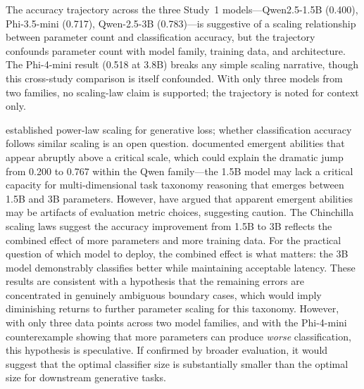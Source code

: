 \documentclass{article}
\begin{document}
The accuracy trajectory across the three Study~1 models---Qwen2.5-1.5B (0.400), Phi-3.5-mini (0.717), Qwen-2.5-3B (0.783)---is suggestive of a scaling relationship between parameter count and classification accuracy, but the trajectory confounds parameter count with model family, training data, and architecture. The Phi-4-mini result (0.518 at 3.8B) breaks any simple scaling narrative, though this cross-study comparison is itself confounded. With only three models from two families, no scaling-law claim is supported; the trajectory is noted for context only.

\citet{kaplan2020scaling} established power-law scaling for generative loss; whether classification accuracy follows similar scaling is an open question. \citet{wei2022emergent} documented emergent abilities that appear abruptly above a critical scale, which could explain the dramatic jump from 0.200 to 0.767 within the Qwen family---the 1.5B model may lack a critical capacity for multi-dimensional task taxonomy reasoning that emerges between 1.5B and 3B parameters. However, \citet{schaeffer2024mirage} have argued that apparent emergent abilities may be artifacts of evaluation metric choices, suggesting caution. The Chinchilla scaling laws \citep{hoffmann2022chinchilla} suggest the accuracy improvement from 1.5B to 3B reflects the combined effect of more parameters and more training data. For the practical question of which model to deploy, the combined effect is what matters: the 3B model demonstrably classifies better while maintaining acceptable latency. These results are consistent with a hypothesis that the remaining errors are concentrated in genuinely ambiguous boundary cases, which would imply diminishing returns to further parameter scaling for this taxonomy. However, with only three data points across two model families, and with the Phi-4-mini counterexample showing that more parameters can produce \emph{worse} classification, this hypothesis is speculative. If confirmed by broader evaluation, it would suggest that the optimal classifier size is substantially smaller than the optimal size for downstream generative tasks.
\end{document}
